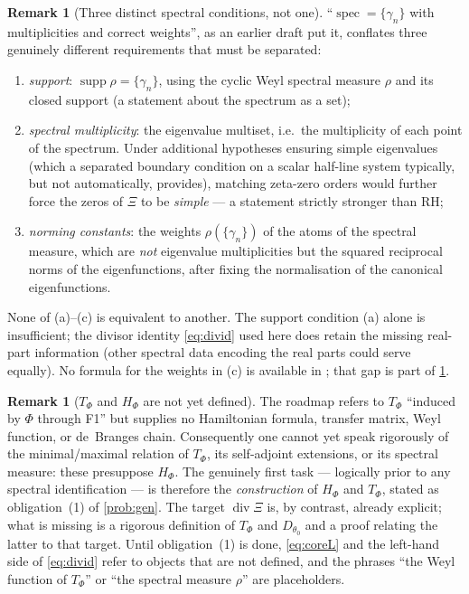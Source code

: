 \documentclass[12pt,a4paper]{amsart}
\theoremstyle{plain}
\theoremstyle{definition}
\newtheorem{remark}[theorem]{Remark}
\newcommand{\Ham}{H}
\begin{document}
\begin{remark}[Three distinct spectral conditions, not one]\label{rem:three-conditions}
  ``$\operatorname{spec}=\{\gamma_n\}$ with multiplicities and correct
  weights'', as an earlier draft put it, conflates three genuinely
  different requirements that must be separated:
  \begin{enumerate}[label=(\alph*)]
    \item \emph{support}: $\operatorname{supp}\rho=\{\gamma_n\}$, using the
          cyclic Weyl spectral measure $\rho$ and its closed support (a
          statement about the spectrum as a set);
    \item \emph{spectral multiplicity}: the eigenvalue multiset, i.e.\
          the multiplicity of each point of the spectrum.  Under
          additional hypotheses ensuring simple eigenvalues (which a
          separated boundary condition on a scalar half-line system
          typically, but not automatically, provides), matching
          zeta-zero orders would further force the zeros of $\Xi$ to be
          \emph{simple} --- a statement strictly stronger than RH;
    \item \emph{norming constants}: the weights $\rho(\{\gamma_n\})$ of
          the atoms of the spectral measure, which are \emph{not}
          eigenvalue multiplicities but the squared reciprocal norms of
          the eigenfunctions, after fixing the normalisation of the
          canonical eigenfunctions.
  \end{enumerate}
  None of (a)--(c) is equivalent to another.  The support condition (a)
  alone is insufficient; the divisor identity \cref{eq:divid} used here
  does retain the missing real-part information (other spectral data
  encoding the real parts could serve equally).  No formula for the
  weights in (c) is available in \cite{SpecRoadmap}; that gap is part of
  \cref{rem:undefined}.
\end{remark}

\begin{remark}[$T_\Phi$ and $\Ham_\Phi$ are not yet defined]\label{rem:undefined}
  The roadmap \cite{SpecRoadmap} refers to $T_\Phi$ ``induced by $\Phi$ through F1''
  but supplies no Hamiltonian formula, transfer matrix, Weyl function, or
  de~Branges chain.  Consequently one cannot yet speak rigorously of the
  minimal/maximal relation of $T_\Phi$, its self-adjoint extensions, or
  its spectral measure: these presuppose $\Ham_\Phi$.  The genuinely first
  task --- logically prior to any spectral identification --- is therefore
  the \emph{construction} of $\Ham_\Phi$ and $T_\Phi$, stated as
  obligation~(1) of \cref{prob:gen}.  The target $\operatorname{div}\Xi$
  is, by contrast, already explicit; what is missing is a rigorous
  definition of $T_\Phi$ and $D_{\theta_0}$ and a proof relating the
  latter to that target.  Until obligation~(1) is done, \cref{eq:coreL}
  and the left-hand side of \cref{eq:divid} refer to objects that are not
  defined, and the phrases
  ``the Weyl function of $T_\Phi$'' or ``the spectral measure $\rho$'' are
  placeholders.
\end{remark}
\end{document}
